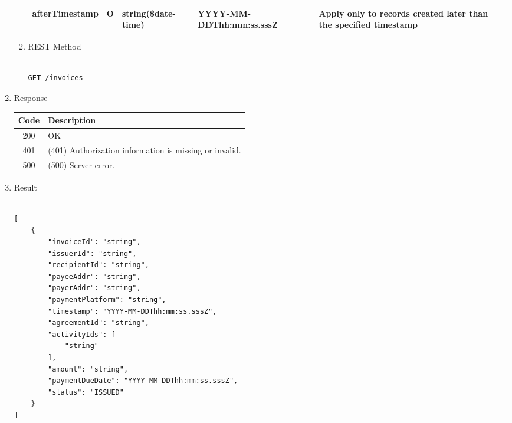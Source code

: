 \begin{enumerate}
\begin{enumerate}
\begin{table}[H]
\begin{center}
\begin{tabular}{|p{3cm}|l|p{3cm}|p{3cm}|p{4cm}|}
afterTimestamp			& O &	string(\$date-time)	&	YYYY-MM-DDThh:mm:ss.sssZ	&	Apply only to records created later than the specified timestamp \\
\hline

\end{tabular}
\end{center}
\end{table}


\item REST Method

\begin{tcolorbox}[boxrule=0pt, frame empty]
\begin{verbatim} 

GET /invoices

\end{verbatim}
\end{tcolorbox}

\end{enumerate}

\item Response

\begin{table}[H]
\footnotesize

\begin{center}
\begin{tabular}{|c|l|} 
\hline
\rowcolor{lightgray}	Code 		& 	Description \\
\hline
200	 		&	OK \\
\hline
401			&	(401) Authorization information is missing or invalid. \\
\hline
500			&	(500) Server error. \\
\hline
\end{tabular}
\end{center}

\end{table}

\item Result

\begin{tcolorbox}[boxrule=0pt, frame empty]
\begin{verbatim}

[
	{
		"invoiceId": "string",
		"issuerId": "string",
		"recipientId": "string",
		"payeeAddr": "string",
		"payerAddr": "string",
		"paymentPlatform": "string",
		"timestamp": "YYYY-MM-DDThh:mm:ss.sssZ",
		"agreementId": "string",
		"activityIds": [
			"string"
		],
		"amount": "string",
		"paymentDueDate": "YYYY-MM-DDThh:mm:ss.sssZ",
		"status": "ISSUED"
	}
]



\end{verbatim}
\end{tcolorbox}
\end{enumerate}
